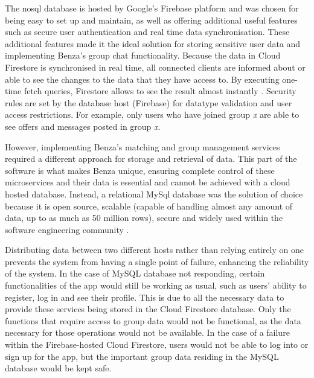\documentclass{article}
\begin{document}
    The \acrshort{nosql} database is hosted by Google's Firebase platform and was chosen for being easy to set up and maintain, as well as offering additional useful features such as secure user authentication \cite{firestoredocs} and real time data synchronisation. These additional features made it the ideal solution for storing sensitive user data and implementing Benza's group chat functionality. Because the data in Cloud Firestore is synchronised in real time, all connected clients are informed about or able to see the changes to the data that they have access to. By executing one-time fetch queries, Firestore allows to see the result almost instantly \cite{firestorevsrealtime}.  Security rules are set by the database host (Firebase) for datatype validation and user access restrictions. For example, only users who have joined group \emph{x} are able to see offers and messages posted in group \emph{x}. \par
    
    However, implementing Benza's matching and group management services required a different approach for storage and retrieval of data. This part of the software is what makes Benza unique, ensuring complete control of these microservices and their data is essential and cannot be achieved with a cloud hosted database. Instead, a relational MySql database was the solution of choice because it is open source, scalable (capable of handling almost any amount of data, up to as much as 50 million rows), secure \cite{featuresMySql} and widely used within the software engineering community \cite{WhyMySql}. \par
    
    Distributing data between two different hosts rather than relying entirely on one prevents the system from having a single point of failure, enhancing the reliability of the system. In the case of MySQL database not responding, certain functionalities of the app would still be working as usual, such as users' ability to register, log in and see their profile. This is due to all the necessary data to provide these services being stored in the Cloud Firestore database. Only the functions that require access to group data would not be functional, as the data necessary for those operations would not be available. In the case of a failure within the Firebase-hosted Cloud Firestore, users would not be able to log into or sign up for the app, but the important group data residing in the MySQL database would be kept safe.\par
\end{document}
